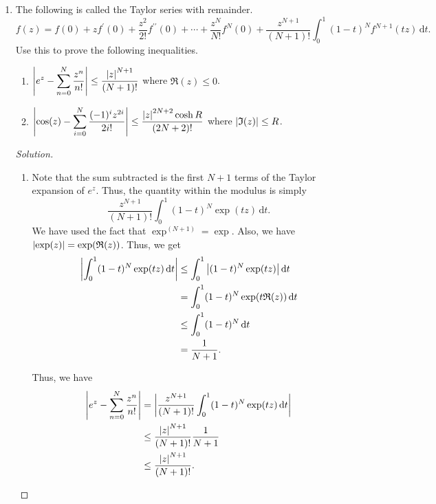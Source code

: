 \documentclass[11pt]{article}
\theoremstyle{definition}
\newenvironment{soln}{\begin{proof}[Solution]}{\end{proof}}
\begin{document}
\begin{enumerate}[leftmargin=*]
    \item The following is called the Taylor series with remainder.
    \[
        f(z) = f(0) + zf^{\prime}(0) + \frac{z^2}{2!} f^{\prime\prime}(0) + \cdots + \frac{z^N}{N!} f^{N}(0) + \frac{z^{N+1}}{(N+1)!} \int_0^1 (1-t)^N f^{N+1}(tz) \, \mathrm{d}t.
    \]
    Use this to prove the following inequalities. 
    \begin{enumerate}
        \item $\displaystyle\abs{e^z - \sum_{n=0}^N \frac{z^n}{n!}} \leq \frac{\abs{z}^{N+1}}{(N+1)!}$ where $\mathfrak{R}(z) \leq 0$. 
        
        \item $\displaystyle\abs{\cos(z) - \sum_{i=0}^N \frac{(-1)^iz^{2i}}{2i!}} \leq \frac{\abs{z}^{2N+2} \cosh{R}}{(2N+2)!}$ where $\abs{\mathfrak{I}(z)} \leq R$.
    \end{enumerate}
    
    \begin{soln} \phantom{hi}
        \begin{enumerate}
            \item Note that the sum subtracted is the first $N+1$ terms of the Taylor expansion of $e^z$. Thus, the quantity within the modulus is simply
            \[
                \frac{z^{N+1}}{(N+1)!} \int_0^1 (1-t)^N \exp(tz) \, \mathrm{d}t.
            \]  
            We have used the fact that $\exp^{(N+1)} = \exp$. Also, we have $\abs{\exp(z)} = \exp(\mathfrak{R}(z))$. Thus, we get
            \begin{align*}
                \abs{\int_0^1 (1-t)^N \exp(tz) \, \mathrm{d}t} &\leq \int_0^1 \abs{(1-t)^N \exp(tz)} \, \mathrm{d}t \\
                &= \int_0^1 (1-t)^N \exp(t\mathfrak{R}(z)) \, \mathrm{d}t \\
                &\leq \int_0^1 (1-t)^N \, \mathrm{d}t \\
                &= \frac{1}{N+1}.
            \end{align*}
            
            Thus, we have
            \begin{align*}
                \abs{e^z - \sum_{n=0}^N \frac{z^n}{n!}} &= \abs{\frac{z^{N+1}}{(N+1)!} \int_0^1 (1-t)^N \exp(tz) \, \mathrm{d}t} \\
                &\leq \frac{\abs{z}^{N+1}}{(N+1)!} \frac{1}{N+1} \\
                &\leq \frac{\abs{z}^{N+1}}{(N+1)!}.
            \end{align*}
            

\end{enumerate}
\end{soln}
\end{enumerate}
\end{document}

